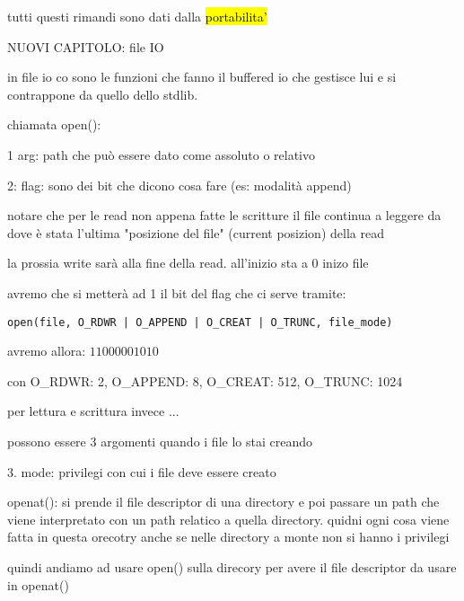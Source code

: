 tutti questi rimandi sono dati dalla \hl{portabilita'}



NUOVI CAPITOLO: file IO

in file io co sono le funzioni che fanno il buffered io che gestisce lui e si contrappone da quello dello stdlib. 

chiamata open():

1 arg: path che può essere dato come assoluto o relativo 

2: flag: sono dei bit che dicono cosa fare (es: modalità append)

notare che per le read non appena fatte le scritture il file continua a leggere da dove è stata l'ultima "posizione del file" (current posizion) della read

la prossia write sarà alla fine della read. all'inizio sta a 0 inizo file

avremo che si metterà ad 1 il bit del flag che ci serve tramite:

\begin{lstlisting}
open(file, O_RDWR | O_APPEND | O_CREAT | O_TRUNC, file_mode)
\end{lstlisting}

avremo allora: $11000001010$

con O\_RDWR: 2, O\_APPEND: 8, O\_CREAT: 512, O\_TRUNC: 1024

per lettura e scrittura invece ...



possono essere 3 argomenti quando i file lo stai creando

3. mode: privilegi con cui i file deve essere creato

openat():
si prende il file descriptor di una directory e poi passare un path che viene interpretato con un path relatico a quella directory. quidni ogni cosa viene fatta in questa orecotry anche se nelle directory a monte non si hanno i privilegi

quindi andiamo ad usare open() sulla direcory per avere il file descriptor da usare in openat()


